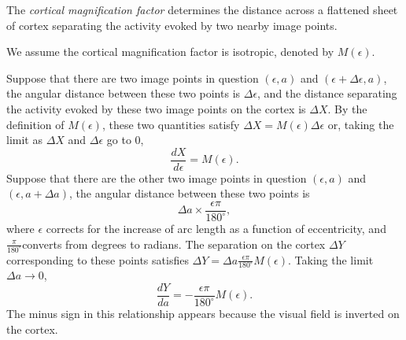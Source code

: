 \begin{defn}
  \label{def:corticalMagnificationFactor}
  The \emph{cortical magnification factor} determines the distance across a flattened sheet of cortex separating the activity evoked by two nearby image points.
\end{defn}

\begin{asm}
  \label{asm:isotropic}
  We assume the cortical magnification factor is isotropic, denoted by $M(\epsilon)$.
\end{asm}

\begin{exm}
  Suppose that there are two image points in question $(\epsilon,a)$ and $(\epsilon+\Delta\epsilon,a)$, the angular distance between these two points is $\Delta\epsilon$, and the distance separating the activity evoked by these two image points on the cortex is $\Delta X$. By the definition of $M(\epsilon)$, these two quantities satisfy $\Delta X = M(\epsilon)\Delta\epsilon$ or, taking the limit as $\Delta X$ and $\Delta\epsilon$ go to $0$,
  \begin{equation}
    \label{equ:2.13}
    \frac{dX}{d\epsilon} = M(\epsilon).
  \end{equation}
  Suppose that there are the other two image points in question $(\epsilon,a)$ and $(\epsilon,a+\Delta a)$, the angular distance between these two points is
  \begin{displaymath}
    \Delta a \times\frac{\epsilon\pi}{180^{\circ}},
  \end{displaymath}
  where $\epsilon$ corrects for the increase of arc length as a function of eccentricity, and $\frac{\pi}{180^{\circ}}$converts from degrees to radians. The separation on the cortex $\Delta Y$ corresponding to these points satisfies $\Delta Y = \Delta a \frac{\epsilon\pi}{180^{\circ}}M(\epsilon)$. Taking the limit $\Delta a \to 0$,
  \begin{equation}
    \label{equ:2.16}
    \frac{dY}{da} = -\frac{\epsilon\pi}{180^{\circ}}M(\epsilon).
  \end{equation}
  The minus sign in this relationship appears because the visual field is inverted on the cortex.
\end{exm}

